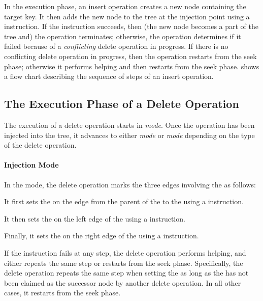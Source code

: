 \begin{limitscope}

In the execution phase, an insert operation creates a new node containing the target key. It then adds the new node to the tree at the injection point using a \CAS{} instruction. If the \CAS{} instruction succeeds, then (the new node becomes a part of the tree and) the operation terminates; otherwise, the operation determines if it failed because of a \emph{conflicting} delete operation in progress. If there is no conflicting delete operation in progress, then the operation restarts from the seek phase; otherwise it performs helping and then restarts from the seek phase.  shows a  flow chart describing the sequence of steps of an insert operation.

\subsection{The Execution Phase of a Delete Operation}
The execution of a delete operation starts in \emph{\injection{} mode}. Once the operation has been injected into the tree, it advances to either \emph{\discovery{} mode} or \emph{\cleanup{} mode} depending on the type of the delete operation.


\paragraph*{Injection Mode}

In the \injection{} mode, the delete operation marks the three edges involving the \targetnode{} as follows:
\begin{enumerate*}[label=(\roman*)]
\item It first sets the \intentFlag{} on the edge from the parent of the \targetnode{} to the \targetnode{} using a \CAS{} instruction.
\item It then sets the \deleteFlag{} on the left edge of the \targetnode{} using a \CAS{} instruction.
\item Finally, it sets the \deleteFlag{} on the right edge of the \targetnode{} using a \CAS{} instruction.
\end{enumerate*}
If the \CAS{} instruction fails at any step, the delete operation performs helping, and either repeats the same step or restarts from the seek phase. Specifically, the delete operation repeats the same step when setting the \deleteFlag{} as long as the \targetnode{} has not been claimed as the successor node by another delete operation. In all other cases, it restarts from the seek phase.



\end{limitscope}
